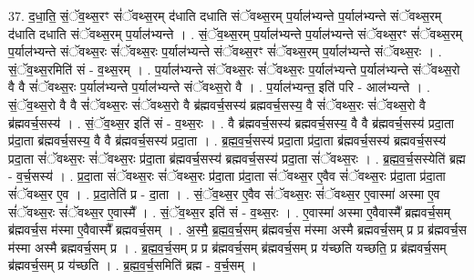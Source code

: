 \documentclass[17pt]{extarticle}
\begin{document}
37. द॒धा॒ति॒ सं॒ॅव॒थ्स॒रꣳ सं॑ॅवथ्स॒रम् द॑धाति दधाति संॅवथ्स॒रम् प॒र्याल॑भ्यन्ते प॒र्याल॑भ्यन्ते संॅवथ्स॒रम् द॑धाति दधाति संॅवथ्स॒रम् प॒र्याल॑भ्यन्ते । . सं॒ॅव॒थ्स॒रम् प॒र्याल॑भ्यन्ते प॒र्याल॑भ्यन्ते संॅवथ्स॒रꣳ सं॑ॅवथ्स॒रम् प॒र्याल॑भ्यन्ते संॅवथ्स॒रः सं॑ॅवथ्स॒रः प॒र्याल॑भ्यन्ते संॅवथ्स॒रꣳ सं॑ॅवथ्स॒रम् प॒र्याल॑भ्यन्ते संॅवथ्स॒रः । . सं॒ॅव॒थ्स॒रमिति॑ सं - व॒थ्स॒रम् । . प॒र्याल॑भ्यन्ते संॅवथ्स॒रः सं॑ॅवथ्स॒रः प॒र्याल॑भ्यन्ते प॒र्याल॑भ्यन्ते संॅवथ्स॒रो वै वै सं॑ॅवथ्स॒रः प॒र्याल॑भ्यन्ते प॒र्याल॑भ्यन्ते संॅवथ्स॒रो वै । . प॒र्याल॑भ्यन्त॒ इति॑ परि - आल॑भ्यन्ते । . सं॒ॅव॒थ्स॒रो वै वै सं॑ॅवथ्स॒रः सं॑ॅवथ्स॒रो वै ब्र॑ह्मवर्च॒सस्य॑ ब्रह्मवर्च॒सस्य॒ वै सं॑ॅवथ्स॒रः सं॑ॅवथ्स॒रो वै ब्र॑ह्मवर्च॒सस्य॑ । . सं॒ॅव॒थ्स॒र इति॑ सं - व॒थ्स॒रः । . वै ब्र॑ह्मवर्च॒सस्य॑ ब्रह्मवर्च॒सस्य॒ वै वै ब्र॑ह्मवर्च॒सस्य॑ प्रदा॒ता प्र॑दा॒ता ब्र॑ह्मवर्च॒सस्य॒ वै वै ब्र॑ह्मवर्च॒सस्य॑ प्रदा॒ता । . ब्र॒ह्म॒व॒र्च॒सस्य॑ प्रदा॒ता प्र॑दा॒ता ब्र॑ह्मवर्च॒सस्य॑ ब्रह्मवर्च॒सस्य॑ प्रदा॒ता सं॑ॅवथ्स॒रः सं॑ॅवथ्स॒रः प्र॑दा॒ता ब्र॑ह्मवर्च॒सस्य॑ ब्रह्मवर्च॒सस्य॑ प्रदा॒ता सं॑ॅवथ्स॒रः । . ब्र॒ह्म॒व॒र्च॒सस्येति॑ ब्रह्म - व॒र्च॒सस्य॑ । . प्र॒दा॒ता सं॑ॅवथ्स॒रः सं॑ॅवथ्स॒रः प्र॑दा॒ता प्र॑दा॒ता सं॑ॅवथ्स॒र ए॒वैव सं॑ॅवथ्स॒रः प्र॑दा॒ता प्र॑दा॒ता सं॑ॅवथ्स॒र ए॒व । . प्र॒दा॒तेति॑ प्र - दा॒ता । . सं॒ॅव॒थ्स॒र ए॒वैव सं॑ॅवथ्स॒रः सं॑ॅवथ्स॒र ए॒वास्मा॑ अस्मा ए॒व सं॑ॅवथ्स॒रः सं॑ॅवथ्स॒र ए॒वास्मै᳚ । . सं॒ॅव॒थ्स॒र इति॑ सं - व॒थ्स॒रः । . ए॒वास्मा॑ अस्मा ए॒वैवास्मै᳚ ब्रह्मवर्च॒सम् ब्र॑ह्मवर्च॒स म॑स्मा ए॒वैवास्मै᳚ ब्रह्मवर्च॒सम् । . अ॒स्मै॒ ब्र॒ह्म॒व॒र्च॒सम् ब्र॑ह्मवर्च॒स म॑स्मा अस्मै ब्रह्मवर्च॒सम् प्र प्र ब्र॑ह्मवर्च॒स म॑स्मा अस्मै ब्रह्मवर्च॒सम् प्र । . ब्र॒ह्म॒व॒र्च॒सम् प्र प्र ब्र॑ह्मवर्च॒सम् ब्र॑ह्मवर्च॒सम् प्र य॑च्छति यच्छति॒ प्र ब्र॑ह्मवर्च॒सम् ब्र॑ह्मवर्च॒सम् प्र य॑च्छति । . ब्र॒ह्म॒व॒र्च॒समिति॑ ब्रह्म - व॒र्च॒सम् । \newline
\end{document}

